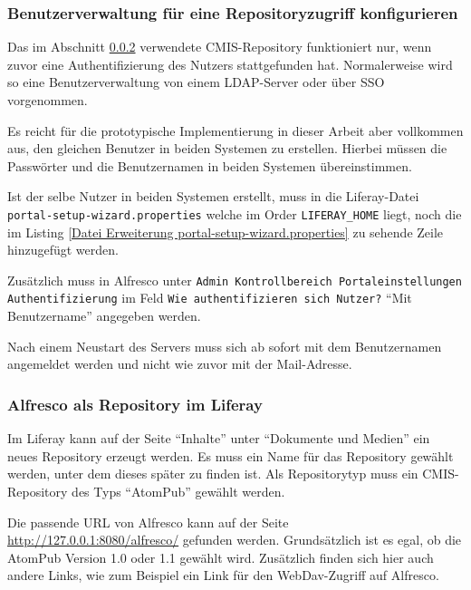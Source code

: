 \subsubsection{Benutzerverwaltung f\"ur eine Repositoryzugriff konfigurieren}\label{Benutzerverwaltung f\"ur eine Repositoryzugriff konfigurieren}
Das im Abschnitt \ref{Alfresco als Repository im Liferay} verwendete CMIS-Repository funktioniert nur, wenn zuvor eine Authentifizierung des Nutzers stattgefunden hat. Normalerweise wird so eine Benutzerverwaltung von einem LDAP-Server oder \"uber SSO vorgenommen. 

Es reicht f\"ur die prototypische Implementierung in dieser Arbeit aber vollkommen aus, den gleichen Benutzer in beiden Systemen zu erstellen. Hierbei m\"ussen die Passw\"orter und die Benutzernamen in beiden Systemen \"ubereinstimmen.

Ist der selbe Nutzer in beiden Systemen erstellt, muss in die Liferay-Datei \\\texttt{portal-setup-wizard.properties} welche im Order \texttt{LIFERAY\_HOME} liegt, noch die im Listing \ref{Datei Erweiterung portal-setup-wizard.properties} zu sehende Zeile hinzugef\"ugt werden. \cite{CMIS_Repo}



Zus\"atzlich muss in Alfresco unter \texttt{Admin \MVRightarrow Kontrollbereich \MVRightarrow Portaleinstellungen \MVRightarrow} \\
\texttt{Authentifizierung} im Feld \texttt{Wie authentifizieren sich Nutzer?} "`Mit Benutzername"' angegeben werden.

Nach einem Neustart des Servers muss sich ab sofort mit dem Benutzernamen angemeldet werden und nicht wie zuvor mit der Mail-Adresse. \cite{CMIS_Config}

\subsubsection{Alfresco als Repository im Liferay}\label{Alfresco als Repository im Liferay}
Im Liferay kann auf der Seite "`Inhalte"' unter "`Dokumente und Medien"' ein neues Repository erzeugt werden. Es muss ein Name f\"ur das Repository gew\"ahlt werden, unter dem dieses sp\"ater zu finden ist. Als Repositorytyp muss ein \ac{CMIS}-Repository des Typs "`AtomPub"' gew\"ahlt werden. 

Die passende URL von Alfresco kann auf der Seite \url{http://127.0.0.1:8080/alfresco/} gefunden werden. Grunds\"atzlich ist es egal, ob die AtomPub Version 1.0 oder 1.1 gew\"ahlt wird. Zus\"atzlich finden sich hier auch andere Links, wie zum Beispiel ein Link f\"ur den WebDav-Zugriff auf Alfresco.


